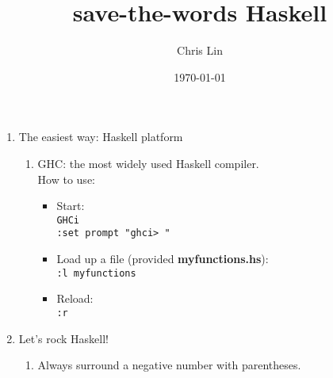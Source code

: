 \documentclass[a4paper,10pt]{article}
\title{save-the-words Haskell}
\author{Chris Lin}
\date{\today}
\begin{document}
\maketitle

\begin{enumerate}
 \item The easiest way: Haskell platform
 \begin{enumerate}
  \item GHC: the most widely used Haskell compiler.\\
  How to use:
  \begin{itemize}
   \item Start:
   \\\texttt{GHCi}
   \\\texttt{:set prompt "ghci> "}
   \item Load up a file (provided \textbf{myfunctions.hs}): 
   \\\texttt{:l myfunctions}
   \item Reload:
   \\\texttt{:r}
  \end{itemize}
 \end{enumerate}
 \item Let's rock Haskell!
 \begin{enumerate}
  \item Always surround a negative number with parentheses.
 \end{enumerate}
\end{enumerate}
\end{document}

